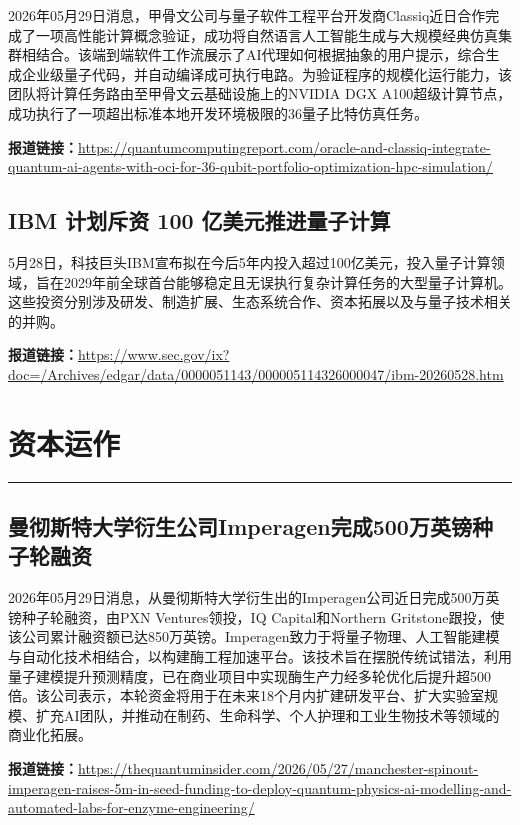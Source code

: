 \documentclass[12pt,a4paper]{ctexart}
\begin{document}
2026年05月29日消息，甲骨文公司与量子软件工程平台开发商Classiq近日合作完成了一项高性能计算概念验证，成功将自然语言人工智能生成与大规模经典仿真集群相结合。该端到端软件工作流展示了AI代理如何根据抽象的用户提示，综合生成企业级量子代码，并自动编译成可执行电路。为验证程序的规模化运行能力，该团队将计算任务路由至甲骨文云基础设施上的NVIDIA DGX A100超级计算节点，成功执行了一项超出标准本地开发环境极限的36量子比特仿真任务。

\noindent\textbf{报道链接：}\url{https://quantumcomputingreport.com/oracle-and-classiq-integrate-quantum-ai-agents-with-oci-for-36-qubit-portfolio-optimization-hpc-simulation/ }

\subsection{ IBM 计划斥资 100 亿美元推进量子计算}

5月28日，科技巨头IBM宣布拟在今后5年内投入超过100亿美元，投入量子计算领域，旨在2029年前全球首台能够稳定且无误执行复杂计算任务的大型量子计算机。这些投资分别涉及研发、制造扩展、生态系统合作、资本拓展以及与量子技术相关的并购。

\noindent\textbf{报道链接：}\url{https://www.sec.gov/ix?doc=/Archives/edgar/data/0000051143/000005114326000047/ibm-20260528.htm}



\newpage
\section{资本运作}
\vspace{-0.5em}
\noindent\rule{\linewidth}{1.5pt}

\subsection{ 曼彻斯特大学衍生公司Imperagen完成500万英镑种子轮融资 }

2026年05月29日消息，从曼彻斯特大学衍生出的Imperagen公司近日完成500万英镑种子轮融资，由PXN Ventures领投，IQ Capital和Northern Gritstone跟投，使该公司累计融资额已达850万英镑。Imperagen致力于将量子物理、人工智能建模与自动化技术相结合，以构建酶工程加速平台。该技术旨在摆脱传统试错法，利用量子建模提升预测精度，已在商业项目中实现酶生产力经多轮优化后提升超500倍。该公司表示，本轮资金将用于在未来18个月内扩建研发平台、扩大实验室规模、扩充AI团队，并推动在制药、生命科学、个人护理和工业生物技术等领域的商业化拓展。

\noindent\textbf{报道链接：}\url{https://thequantuminsider.com/2026/05/27/manchester-spinout-imperagen-raises-5m-in-seed-funding-to-deploy-quantum-physics-ai-modelling-and-automated-labs-for-enzyme-engineering/ }
\end{document}
